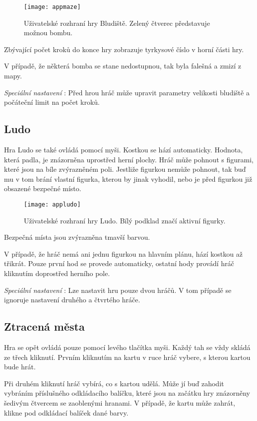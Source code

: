 \begin{figure}
  \centering
  \texttt{[image: appmaze]}
	\caption{Uživatelské rozhraní hry Bludiště. Zelený čtverec představuje možnou bombu. }
	\label{fig-appmaze}
\end{figure}

Zbývající počet kroků do konce hry zobrazuje tyrkysové číslo v horní části hry. 

V případě, že některá bomba se stane nedostupnou, tak byla falešná a zmizí z mapy.

\emph{Speciální nastavení} : Před hrou hráč může upravit parametry velikosti bludiště a počáteční limit na počet kroků.

\subsection{Ludo}

Hra Ludo se také ovládá pomocí myši. Kostkou se hází automaticky. Hodnota, která padla, je znázorněna uprostřed herní plochy. Hráč může pohnout s figurami, které jsou na bíle zvýrazněném poli. Jestliže figurkou nemůže pohnout, tak buď mu v tom brání vlastní figurka, kterou by jinak vyhodil, nebo je před figurkou již obsazené bezpečné místo.

\begin{figure}
  \centering
  \texttt{[image: appludo]}
	\caption{Uživatelské rozhraní hry Ludo. Bílý podklad značí aktivní figurky. }
	\label{fig-appludo}
\end{figure}

Bezpečná místa jsou zvýrazněna tmavší barvou.

V případě, že hráč nemá ani jednu figurkou na hlavním plánu, hází kostkou až třikrát. Pouze první hod se provede automaticky, ostatní hody provádí hráč kliknutím doprostřed herního pole.

\emph{Speciální nastavení} : Lze nastavit hru pouze dvou hráčů. V tom případě se ignoruje nastavení druhého a čtvrtého hráče.

\subsection{Ztracená města}

Hra se opět ovládá pouze pomocí levého tlačítka myši. Každý tah se vždy skládá ze třech kliknutí. Prvním kliknutím na kartu v ruce hráč vybere, s kterou kartou bude hrát. 

Při druhém kliknutí hráč vybírá, co s kartou udělá. Může jí buď zahodit vybráním příslušného odkládacího balíčku, které jsou na začátku hry znázorněny šedivým čtvercem se zaoblenými hranami. V případě, že kartu může zahrát, klikne pod odkládací balíček dané barvy. 


